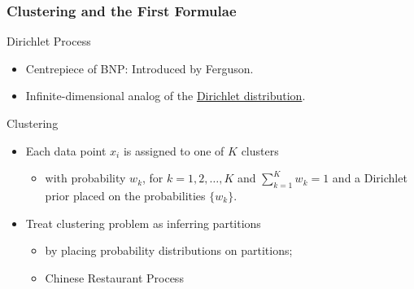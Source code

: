 \begin{frame}[label=dirichletprocess]
    \frametitle{Clustering and the First Formulae}

    \begin{block}{Dirichlet Process}
        \begin{itemize}
            \item Centrepiece of BNP: Introduced by Ferguson. 
            \item Infinite-dimensional analog of the \hyperlink{dirichletsupplemental}{Dirichlet distribution}. 
        \end{itemize}
    \end{block}

    \begin{block}{Clustering}
        \begin{itemize}
            \item Each data point $x_i$ is assigned to one of $K$ clusters
            \begin{itemize}
                \item with probability $w_k$, for $k=1,2,\ldots,K$ and $\sum_{k=1}^Kw_k=1$ and a Dirichlet prior placed on the probabilities $\{w_k\}$.
            \end{itemize}
            \item Treat clustering problem as inferring partitions
            \begin{itemize}
                \item by placing probability distributions on partitions;
                \item Chinese Restaurant Process
            \end{itemize}
        \end{itemize}
    \end{block}
\end{frame}

